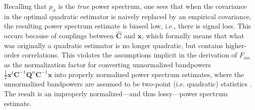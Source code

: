 \documentclass[preprint2,numberedappendix,tighten]{aastex6}
\newcommand{\x}{\mathbf{x}}
\newcommand{\C}{\mathbf{C}}
\newcommand{\Q}{\mathbf{Q}}
\begin{document}
Recalling that $p_\alpha$ is the \emph{true} power spectrum, one sees that when the covariance in the optimal quadratic estimator is naively replaced by an empirical covariance, the resulting power spectrum estimate is biased low, i.e., there is signal loss. This occurs because of couplings between $\widehat{\C}$ and $\x$, which formally means that what was originally a quadratic estimator is no longer quadratic, but contains higher-order correlations. This violates the assumptions implicit in the derivation of $F_{\alpha \alpha}$ as the normalization factor for converting unnormalized bandpowers $\frac{1}{2} \x^t \C^{-1} \Q^{\alpha} \C^{-1} \x$ into properly normalized power spectrum estimates, where the unnormalized bandpowers are assumed to be two-point (i.e. quadratic) statistics \citep{liu_tegmark2011}. The result is an improperly normalized---and thus lossy---power spectrum estimate.
\end{document}
